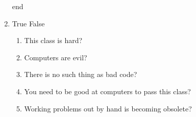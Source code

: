 \begin{enumerate}
end

\item True False

  \begin{enumerate}
     \item This class is hard?
     \item Computers are evil?
     \item There is no such thing as bad code?
     \item You need to be good at computers to pass this class?
     \item Working problems out by hand is becoming obsolete?
  \end{enumerate}

\end{enumerate}
